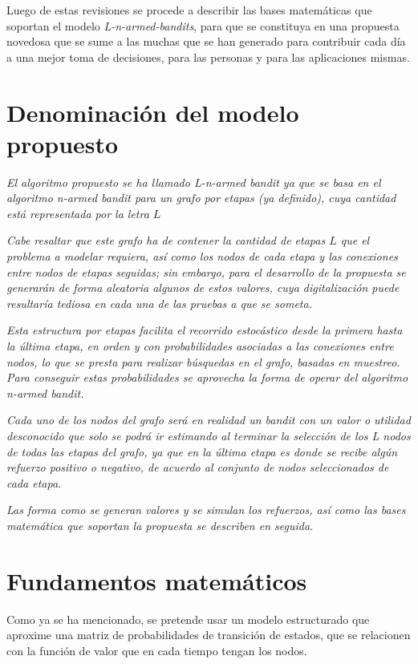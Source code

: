 Luego de estas revisiones se procede a describir las bases matemáticas que soportan el modelo \textit{L-n-armed-bandits}, para que se constituya en una propuesta novedosa que se sume a las muchas que se han generado para contribuir cada día a una mejor toma de decisiones, para las personas y para las aplicaciones mismas.

\section{Denominación del modelo propuesto}
\label{nombre}

\textit{El algoritmo propuesto se ha llamado \textit{L-n-armed bandit} ya que se basa en el algoritmo \textit{n-armed bandit} para un grafo por etapas (ya definido), cuya cantidad está representada por la letra $L$}

\textit{Cabe resaltar que este grafo ha de contener la cantidad de etapas $L$ que el problema a modelar requiera, así como los nodos de cada etapa y las conexiones entre nodos de etapas seguidas; sin embargo, para el desarrollo de la propuesta se generarán de forma aleatoria algunos de estos valores, cuya digitalización puede resultaría tediosa en cada una de las pruebas a que se someta.}

\textit{Esta estructura por etapas facilita el recorrido estocástico desde la primera hasta la última etapa, en orden y con probabilidades asociadas a las conexiones entre nodos, lo que se presta para realizar búsquedas en el grafo, basadas en muestreo. Para conseguir estas probabilidades se aprovecha la forma de operar del algoritmo \textit{n-armed bandit}.}

\textit{Cada uno de los nodos del grafo será en realidad un \textit{bandit} con un valor o utilidad desconocido que solo se podrá ir estimando al terminar la selección de los L nodos de todas las etapas del grafo, ya que en la última etapa es donde se recibe algún refuerzo positivo o negativo, de acuerdo al conjunto de nodos seleccionados de cada etapa.}

\textit{Las forma como se generan valores y se simulan los refuerzos, así como las bases matemática que soportan la propuesta se describen en seguida.}

\section{Fundamentos matemáticos}

Como ya se ha mencionado, se pretende usar un modelo estructurado que aproxime una matriz de probabilidades de transición de estados, que se relacionen con la función de valor que en cada tiempo tengan los nodos.

